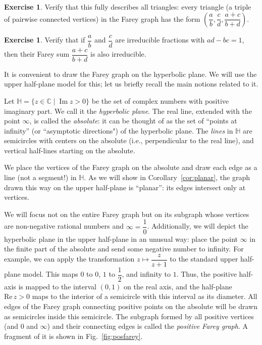 \documentclass[a4paper,11pt]{amsart}
\newcommand{\CC}{{\mathbb{C}}}
\newcommand{\HH}{{\mathbb{H}}}
\renewcommand{\Im}{\mathop{\mathrm{Im}}}
\theoremstyle{plain}
\theoremstyle{remark}
\theoremstyle{definition}
\newtheorem{exercise}[theorem]{Exercise}
\numberwithin{equation}{section}
\numberwithin{figure}{section}
\begin{document}
\begin{exercise} Verify that this fully describes all triangles: every triangle (a triple of pairwise connected vertices) in the Farey graph has the form $\left(\dfrac ab,\dfrac cd, \dfrac{a+c}{b+d}\right)$.
\end{exercise}

\begin{exercise} Verify that if $\dfrac ab$ and $\dfrac cd$ are irreducible fractions with $ad-bc=1$, then their Farey sum $\dfrac{a+c}{b+d}$ is also irreducible.
\end{exercise}

It is convenient to draw the Farey graph on the hyperbolic plane. We will use the upper half-plane model for this; let us briefly recall the main notions related to it.

Let $\HH=\{z\in\CC\mid \Im z>0\}$ be the set of complex numbers with positive imaginary part. We call it the \emph{hyperbolic plane}. The real line, extended with the point $\infty$, is called the \emph{absolute}: it can be thought of as the set of ``points at infinity'' (or ``asymptotic directions") of the hyperbolic plane. The \emph{lines} in $\HH$ are semicircles with centers on the absolute (i.e., perpendicular to the real line), and vertical half-lines starting on the absolute.

We place the vertices of the Farey graph on the absolute and draw each edge as a line (not a segment!) in $\HH$. As we will show in Corollary~\ref{cor:planar}, the graph drawn this way on the upper half-plane is ``planar'': its edges intersect only at vertices.

We will focus not on the entire Farey graph but on its subgraph whose vertices are non-negative rational numbers and $\infty=\dfrac 10$. Additionally, we will depict the hyperbolic plane in the upper half-plane in an unusual way: place the point $\infty$ in the finite part of the absolute and send some negative number to infinity. For example, we can apply the transformation $z\mapsto\dfrac{z}{z+1}$ to the standard upper half-plane model. This maps $0$ to $0$, $1$ to $\dfrac 12$, and infinity to $1$. Thus, the positive half-axis is mapped to the interval $(0,1)$ on the real axis, and the half-plane $\mathrm{Re}\,z>0$ maps to the interior of a semicircle with this interval as its diameter. All edges of the Farey graph connecting positive points on the absolute will be drawn as semicircles inside this semicircle. The subgraph formed by all positive vertices (and $0$ and $\infty$) and their connecting edges is called the \emph{positive Farey graph}. A fragment of it is shown in Fig.~\ref{fig:posfarey}.
\end{document}
